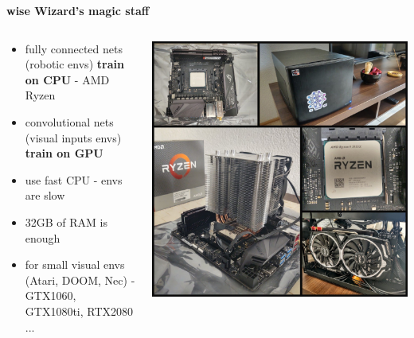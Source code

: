\documentclass[xcolor=dvipsnames]{beamer}
\begin{document}
\begin{frame}{\bf wise Wizard's magic staff}

  \begin{columns}

    \begin{column}{0.5\textwidth}
      \begin{itemize}
        \item fully connected nets (robotic envs) {\bf \color{red} train on CPU} - AMD Ryzen
        \item convolutional nets (visual inputs envs) {\bf \color{red} train on GPU}
        \item use fast CPU - envs are slow
        \item 32GB of RAM is enough
        \item for small visual envs (Atari, DOOM, Nec) - GTX1060, GTX1080ti, RTX2080 ...
      \end{itemize}
    \end{column}

    \begin{column}{0.5\textwidth}
      {\centering \includegraphics[scale=0.1]{../images/computer.jpg}}
    \end{column}

  \end{columns}


\end{frame}
\end{document}
